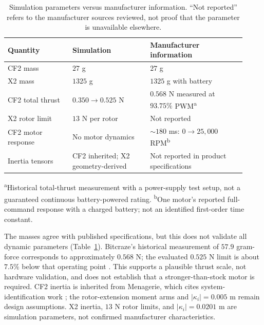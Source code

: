 \documentclass[letterpaper,10pt,conference]{IEEEtran}
\begin{document}
\begin{table}[!ht]
\centering
\caption{Simulation parameters versus manufacturer information.
``Not reported'' refers to the manufacturer sources reviewed, not proof
that the parameter is unavailable elsewhere.}
\label{tab:manufacturer}
\setlength{\tabcolsep}{3pt}
\footnotesize
\begin{tabular}{@{}>{\raggedright\arraybackslash}p{0.25\linewidth}>{\raggedright\arraybackslash}p{0.30\linewidth}>{\raggedright\arraybackslash}p{0.37\linewidth}@{}}
\toprule
Quantity & Simulation & Manufacturer information\\
\midrule
CF2 mass & $27$ g & $27$ g \cite{bitcrazeCF20Specs}\\
X2 mass & $1325$ g & $1325$ g with battery \cite{skydioX2ESpecs}\\
CF2 total thrust & $0.350\to0.525$ N & $0.568$ N measured at $93.75\%$ PWM\textsuperscript{a} \cite{bitcrazeThrustMeasurements}\\
X2 rotor limit & $13$ N per rotor & Not reported \cite{skydioX2ESpecs}\\
CF2 motor response & No motor dynamics & $\sim180$ ms: $0\to25{,}000$ RPM\textsuperscript{b} \cite{bitcrazeMotorResponse}\\
Inertia tensors & CF2 inherited; X2 geometry-derived & Not reported in product specifications \cite{bitcrazeCF20Specs,skydioX2ESpecs}\\
\bottomrule
\end{tabular}
\par\smallskip
\begin{minipage}{0.97\linewidth}
\scriptsize
\textsuperscript{a}Historical total-thrust measurement with a power-supply
test setup, not a guaranteed continuous battery-powered rating.
\textsuperscript{b}One motor's reported full-command response with a
charged battery; not an identified first-order time constant.
\end{minipage}
\end{table}

The masses agree with published specifications, but this does not
validate all dynamic parameters (Table~\ref{tab:manufacturer}). Bitcraze's
historical measurement of $57.9$ gram-force corresponds to approximately
$0.568$ N; the evaluated $0.525$ N limit is about $7.5\%$ below that
operating point \cite{bitcrazeThrustMeasurements}. This supports a plausible
thrust scale, not hardware validation, and does not establish that a
stronger-than-stock motor is required. CF2 inertia is inherited from
Menagerie, which cites system-identification work \cite{menagerieCF2}; the
rotor-extension moment arms and $|\kappa_i|=0.005$ m remain design
assumptions. X2 inertia, $13$ N rotor limits, and $|\kappa_i|=0.0201$ m are
simulation parameters, not confirmed manufacturer characteristics.
\end{document}
